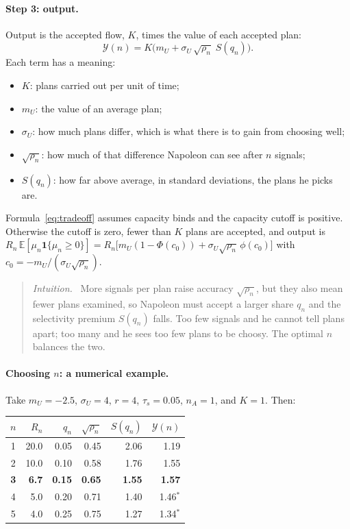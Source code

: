 \documentclass[11pt]{article}
\newcommand{\Nap}{\textcolor{nap}{Napoleon}}
\theoremstyle{remark}
\newenvironment{intuition}{\begin{quote}\small\color{muted}\textit{Intuition.}\ }{\end{quote}}
\newcommand{\E}{\mathbb{E}}
\newcommand{\Ycal}{\mathcal{Y}}
\begin{document}
\paragraph{Step 3: output.} Output is the accepted flow, $K$, times the value of each accepted plan:
\begin{equation}\label{eq:tradeoff}
\Ycal(n)=K\Big(m_U+\sigma_U\,\sqrt{\rho_n}\;S(q_n)\Big).
\end{equation}
Each term has a meaning:
\begin{itemize}
  \item $K$: plans carried out per unit of time;
  \item $m_U$: the value of an average plan;
  \item $\sigma_U$: how much plans differ, which is what there is to gain from choosing well;
  \item $\sqrt{\rho_n}$: how much of that difference \Nap{} can see after $n$ signals;
  \item $S(q_n)$: how far above average, in standard deviations, the plans he picks are.
\end{itemize}
Formula~\eqref{eq:tradeoff} assumes capacity binds and the capacity cutoff is positive. Otherwise the cutoff is zero, fewer than $K$ plans are accepted, and output is $R_n\,\E[\mu_n\mathbf 1\{\mu_n\ge0\}]=R_n\big[m_U(1-\Phi(c_0))+\sigma_U\sqrt{\rho_n}\,\phi(c_0)\big]$ with $c_0=-m_U/(\sigma_U\sqrt{\rho_n})$.

\begin{intuition}
More signals per plan raise accuracy $\sqrt{\rho_n}$, but they also mean fewer plans examined, so \Nap{} must accept a larger share $q_n$ and the selectivity premium $S(q_n)$ falls. Too few signals and he cannot tell plans apart; too many and he sees too few plans to be choosy. The optimal $n$ balances the two.
\end{intuition}

\paragraph{Choosing $n$: a numerical example.} Take $m_U=-2.5$, $\sigma_U=4$, $r=4$, $\tau_s=0.05$, $n_A=1$, and $K=1$. Then:

\begin{center}
\renewcommand{\arraystretch}{1.15}
\begin{tabular}{@{}c r r r r r@{}}
\toprule
$n$ & $R_n$ & $q_n$ & $\sqrt{\rho_n}$ & $S(q_n)$ & $\Ycal(n)$\\
\midrule
1 & 20.0 & 0.05 & 0.45 & 2.06 & 1.19\\
2 & 10.0 & 0.10 & 0.58 & 1.76 & 1.55\\
\textbf{3} & \textbf{6.7} & \textbf{0.15} & \textbf{0.65} & \textbf{1.55} & \textbf{1.57}\\
4 & 5.0 & 0.20 & 0.71 & 1.40 & 1.46$^*$\\
5 & 4.0 & 0.25 & 0.75 & 1.27 & 1.34$^*$\\
\bottomrule
\end{tabular}
\end{center}
\end{document}

